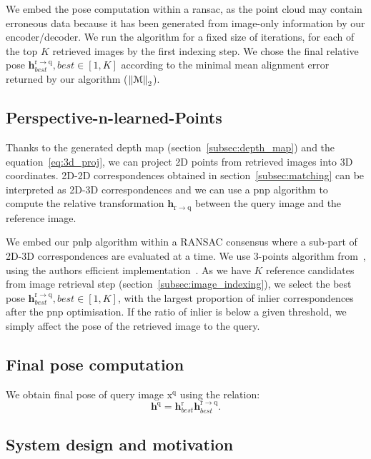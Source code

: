 We embed the pose computation within a \ac{ransac}, as the point cloud may contain erroneous data because it has been generated from image-only information by our encoder/decoder. We run the algorithm for a fixed size of iterations, for each of the top $K$ retrieved images by the first indexing step. We chose the final relative pose $\mathbf{h}^\mathrm{r \rightarrow q}_{best}, best\in\left[1,K\right]$ according to the minimal mean alignment error returned by our algorithm ($\left\lVert\mathcal{M}\right\rVert_2$).

\subsection{Perspective-n-learned-Points}
\label{subsec:pnlp}
Thanks to the generated depth map (section~\ref{subsec:depth_map}) and the equation~\ref{eq:3d_proj}, we can project 2D points from retrieved images into 3D coordinates. 2D-2D correspondences obtained in section~\ref{subsec:matching} can be interpreted as 2D-3D correspondences and we can use a \ac{pnp} algorithm to compute the relative transformation $\mathbf{h}_\mathrm{r \rightarrow q}$ between the query image and the reference image. 

We embed our \ac{pnlp} algorithm within a RANSAC consensus where a sub-part of 2D-3D correspondences are evaluated at a time. We use 3-points algorithm from~\citep{Kneip2011}, using the authors efficient implementation~\citep{Kneip2014opengv}. As we have $K$ reference candidates from image retrieval step (section~\ref{subsec:image_indexing}), we select the best pose $\mathbf{h}^\mathrm{r \rightarrow q}_{best}, best\in\left[1,K\right]$, with the largest proportion of inlier correspondences after the \ac{pnp} optimisation. If the ratio of inlier is below a given threshold, we simply affect the pose of the retrieved image to the query.

\subsection{Final pose computation}
We obtain final pose of query image $\mathrm{x^q}$ using the relation:
\begin{equation}
	\mathbf{h}^\mathrm{q} = \mathbf{h}^\mathrm{r}_{best}\mathbf{h}^\mathrm{r \rightarrow q}_{best}.
\end{equation}

\subsection{System design and motivation}
